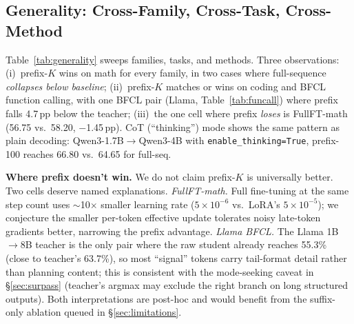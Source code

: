 \documentclass[10pt]{article}
\begin{document}
\subsection{Generality: Cross-Family, Cross-Task, Cross-Method}
\label{sec:generality}

Table~\ref{tab:generality} sweeps families, tasks, and methods. Three observations: (i)~prefix-$K$ wins on math for every family, in two cases where full-sequence \emph{collapses below baseline}; (ii)~prefix-$K$ matches or wins on coding and BFCL function calling, with one BFCL pair (Llama, Table~\ref{tab:funcall}) where prefix falls 4.7\,pp below the teacher; (iii)~the one cell where prefix \emph{loses} is FullFT-math (56.75 vs.\ 58.20, $-$1.45\,pp). CoT (``thinking'') mode shows the same pattern as plain decoding: Qwen3-1.7B$\to$Qwen3-4B with \texttt{enable\_thinking=True}, prefix-100 reaches 66.80 vs.\ 64.65 for full-seq.

\textbf{Where prefix doesn't win.} We do not claim prefix-$K$ is universally better. Two cells deserve named explanations. \emph{FullFT-math.} Full fine-tuning at the same step count uses $\sim$10$\times$ smaller learning rate ($5{\times}10^{-6}$ vs.\ LoRA's $5{\times}10^{-5}$); we conjecture the smaller per-token effective update tolerates noisy late-token gradients better, narrowing the prefix advantage. \emph{Llama BFCL.} The Llama 1B$\to$8B teacher is the only pair where the raw student already reaches 55.3\% (close to teacher's 63.7\%), so most ``signal'' tokens carry tail-format detail rather than planning content; this is consistent with the mode-seeking caveat in \S\ref{sec:surpass} (teacher's argmax may exclude the right branch on long structured outputs). Both interpretations are post-hoc and would benefit from the suffix-only ablation queued in \S\ref{sec:limitations}.
\end{document}
